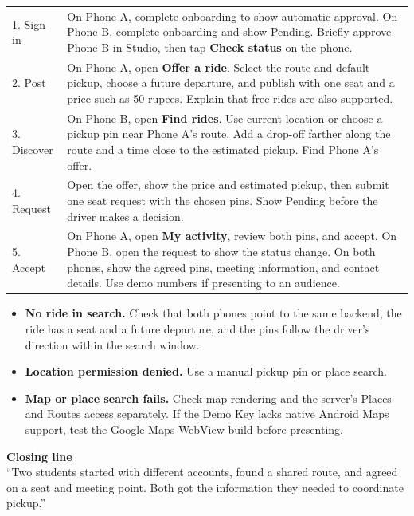 \documentclass[11pt,a4paper]{article}
\newcommand{\subhead}[1]{\par\addvspace{8pt}{\large\bfseries\textcolor{Pine}{#1}}\par\nopagebreak[4]}
\newcommand{\panel}[1]{%
  \par\noindent\colorbox{Wash}{\parbox{\dimexpr\linewidth-2\fboxsep\relax}{\setlength{\parskip}{4pt}#1}}\par
}
\begin{document}
\subhead{What to show and say}
\begin{tabularx}{\linewidth}{@{}L{33mm}@{\hspace{5mm}}Y@{}}
. Sign in & On Phone A, complete onboarding to show automatic approval. On Phone B, complete onboarding and show Pending. Briefly approve Phone B in Studio, then tap \textbf{Check status} on the phone. \\
2. Post & On Phone A, open \textbf{Offer a ride}. Select the route and default pickup, choose a future departure, and publish with one seat and a price such as 50 rupees. Explain that free rides are also supported. \\
3. Discover & On Phone B, open \textbf{Find rides}. Use current location or choose a pickup pin near Phone A's route. Add a drop-off farther along the route and a time close to the estimated pickup. Find Phone A's offer. \\
4. Request & Open the offer, show the price and estimated pickup, then submit one seat request with the chosen pins. Show Pending before the driver makes a decision. \\
5. Accept & On Phone A, open \textbf{My activity}, review both pins, and accept. On Phone B, open the request to show the status change. On both phones, show the agreed pins, meeting information, and contact details. Use demo numbers if presenting to an audience. \\
\bottomrule
\end{tabularx}

\subhead{If something stalls}
\begin{itemize}
  \item \textbf{No ride in search.} Check that both phones point to the same backend, the ride has a seat and a future departure, and the pins follow the driver's direction within the search window.
  \item \textbf{Location permission denied.} Use a manual pickup pin or place search.
  \item \textbf{Map or place search fails.} Check map rendering and the server's Places and Routes access separately. If the Demo Key lacks native Android Maps support, test the Google Maps WebView build before presenting.
\end{itemize}

\panel{\textbf{Closing line}\\
\textquotedblleft Two students started with different accounts, found a shared route, and agreed on a seat and meeting point. Both got the information they needed to coordinate pickup.\textquotedblright}
\end{document}
